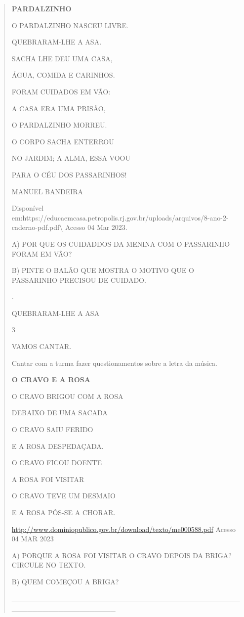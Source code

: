 \begin{verse}
{\textbf{PARDALZINHO}

O PARDALZINHO NASCEU LIVRE.

\protect\hypertarget{_Hlk128840862}{}{}QUEBRARAM-LHE A ASA.

SACHA LHE DEU UMA CASA,

ÁGUA, COMIDA E CARINHOS.

FORAM CUIDADOS EM VÃO:

A CASA ERA UMA PRISÃO,

O PARDALZINHO MORREU.

O CORPO SACHA ENTERROU

NO JARDIM; A ALMA, ESSA \protect\hypertarget{_Hlk128858343}{}{}VOOU

PARA O CÉU DOS PASSARINHOS!

MANUEL BANDEIRA

Disponível
em:https://educaemcasa.petropolis.rj.gov.br/uploads/arquivos/8-ano-2-caderno-pdf.pdf\textbackslash{}
Acesso 04 Mar 2023.

A) POR QUE OS CUIDADDOS DA MENINA COM O PASSARINHO FORAM EM VÃO?


B) PINTE O BALÃO QUE MOSTRA O MOTIVO QUE O PASSARINHO PRECISOU DE
CUIDADO.

.

QUEBRARAM-LHE A ASA

\num{3}

VAMOS CANTAR.

Cantar com a turma fazer questionamentos sobre a letra da música.

\textbf{O CRAVO E A ROSA}

O CRAVO BRIGOU COM A ROSA

DEBAIXO DE UMA SACADA

O CRAVO SAIU FERIDO

E A ROSA DESPEDAÇADA.

\protect\hypertarget{_Hlk128859393}{}{}O CRAVO FICOU DOENTE

A ROSA FOI VISITAR

O CRAVO TEVE UM DESMAIO

E A ROSA PÔS-SE A CHORAR.

\url{http://www.dominiopublico.gov.br/download/texto/me000588.pdf}
Acesso 04 MAR 2023

A) PORQUE A ROSA FOI VISITAR O CRAVO DEPOIS DA BRIGA? CIRCULE NO TEXTO.

B) QUEM COMEÇOU A BRIGA?

\_\_\_\_\_\_\_\_\_\_\_\_\_\_\_\_\_\_\_\_\_\_\_\_\_\_\_\_\_\_\_\_\_\_\_\_\_\_\_\_\_\_\_\_\_\_\_\_\_\_\_\_\_\_\_\_\_\_\_\_\_\_\_\_

}
\end{verse}
